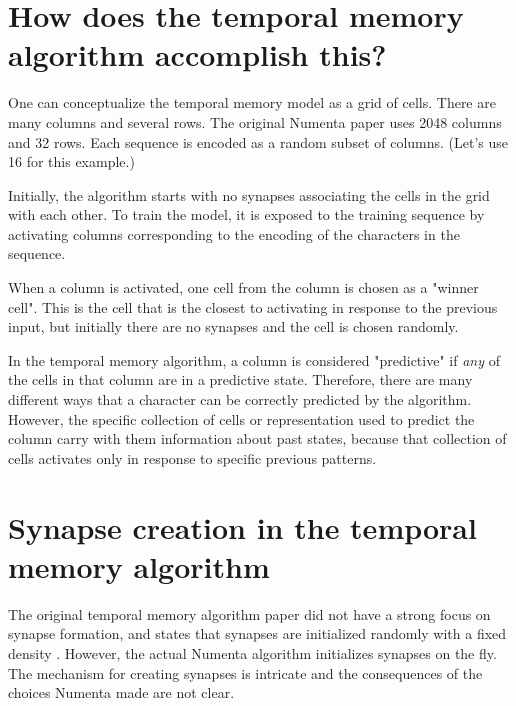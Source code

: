 \documentclass{article}
\begin{document}
\section*{How does the temporal memory algorithm accomplish this?}

One can conceptualize the temporal memory model as a grid of cells. There are many columns and several rows. The original Numenta paper uses 2048 columns and 32 rows. Each sequence is encoded as a random subset of columns. (Let's use 16 for this example.)

Initially, the algorithm starts with no synapses associating the cells in the grid with each other. To train the model, it is exposed to the training sequence by activating columns corresponding to the encoding of the characters in the sequence.

When a column is activated, one cell from the column is chosen as a "winner cell". This is the cell that is the closest to activating in response to the previous input, but initially there are no synapses and the cell is chosen randomly.

In the temporal memory algorithm, a column is considered "predictive" if \textit{any} of the cells in that column are in a predictive state. Therefore, there are many different ways that a character can be correctly predicted by the algorithm. However, the specific collection of cells or representation used to predict the column carry with them information about past states, because that collection of cells activates only in response to specific previous patterns.

\section*{Synapse creation in the temporal memory algorithm}

The original temporal memory algorithm paper did not have a strong focus on synapse formation, and states that synapses are initialized randomly with a fixed density \cite{Hawkins2016}. However, the actual Numenta algorithm initializes synapses on the fly. The mechanism for creating synapses is intricate and the consequences of the choices Numenta made are not clear.
\newline
\end{document}

